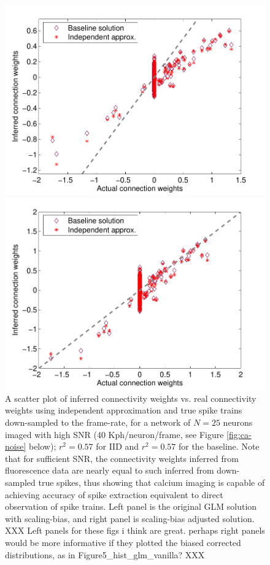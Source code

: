 \begin{figure}[h]
\centering
\begin{minipage}[c]{0.45\hsize}
\includegraphics[width=\hsize]{../figs/Figure2_fluor_base_vs_iid}
\end{minipage}
\begin{minipage}[c]{0.45\hsize}
\includegraphics[width=\hsize]{../figs/Figure2b_fluor_base_vs_iid}
\end{minipage}
\caption{A scatter plot of inferred connectivity weights vs. real connectivity weights using independent approximation and true spike trains down-sampled to the frame-rate, for a network of $N=25$ neurons imaged with high SNR (40 Kph/neuron/frame, see Figure \ref{fig:ca-noise} below); $r^2=0.57$ for IID and $r^2=0.57$ for the baseline. Note that for sufficient SNR, the connectivity weights inferred from fluorescence data are nearly equal to such inferred from down-sampled true spikes, thus showing that calcium imaging is capable of achieving accuracy of spike extraction equivalent to direct observation of spike trains. Left panel is the original GLM solution with scaling-bias, and right panel is scaling-bias adjusted solution.  XXX Left panels for these figs i think are great.  perhaps right panels would be more informative if they plotted the biased corrected distributions, as in Figure5_hist_glm_vanilla? XXX}
\label{fig:iid-base}
\end{figure}

